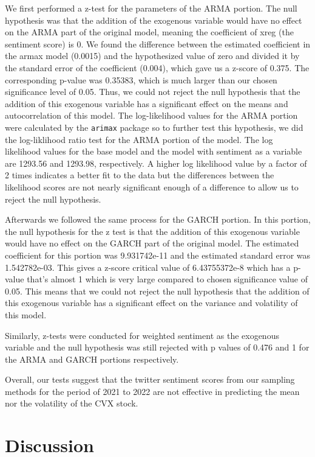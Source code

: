 \documentclass[12pt, letterpaper, titlepage]{article}
\begin{document}
We first performed a z-test for the parameters of the ARMA portion. The null hypothesis was that the addition of the exogenous variable would have no effect on the ARMA part of the original model, meaning the coefficient of xreg (the sentiment score) is 0. We found the difference between the estimated coefficient in the armax model (0.0015) and the hypothesized value of zero and divided it by the standard error of the coefficient (0.004), which gave us a z-score of 0.375. The corresponding p-value was 0.35383, which is much larger than our chosen significance level of 0.05. Thus, we could not reject the null hypothesis that the addition of this exogenous variable has a significant effect on the means and autocorrelation of this model.  The log-likelihood values for the ARMA portion were calculated by the \texttt{arimax} package so to further test this hypothesis, we did the log-liklihood ratio test for the ARMA portion of the model. The log likelihood values for the base model and the model with sentiment as a variable are 1293.56 and 1293.98, respectively. A higher log likelihood value by a factor of 2 times indicates a better fit to the data but the differences between the likelihood scores are not nearly significant enough of a difference to allow us to reject the null hypothesis.

Afterwards we followed the same process for the GARCH portion. In this portion, the null hypothesis for the z test is that the addition of this exogenous variable would have no effect on the GARCH part of the original model. The estimated coefficient for this portion was 9.931742e-11  and the estimated standard error was 1.542782e-03. This gives a z-score critical value of 6.43755372e-8 which has a p-value that's almost 1 which is very large compared to chosen significance value of 0.05. This means that we could not reject the null hypothesis that the addition of this exogenous variable has a significant effect on the variance and volatility of this model. 

Similarly, z-tests were conducted for weighted sentiment as the exogenous variable and the null hypothesis was still rejected with p values of 0.476 and 1 for the ARMA and GARCH portions respectively.

Overall, our tests suggest that the twitter sentiment scores from our sampling methods for the period of 2021 to 2022 are not effective in predicting the mean nor the volatility of the CVX stock.

\section{Discussion}
\label{sec:discussion}
\end{document}
